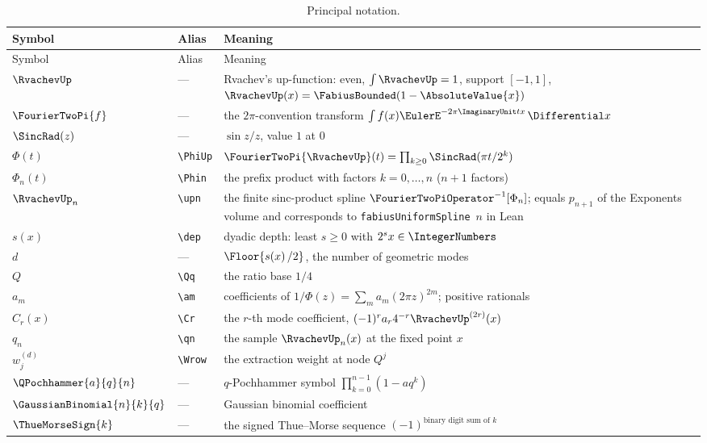 \documentclass[11pt,oneside]{article}
\theoremstyle{plain}
\theoremstyle{definition}
\theoremstyle{remark}
\newcommand{\upn}[1]{\RvachevUp_{#1}}
\newcommand{\Phin}[1]{\Phi_{#1}}                            %
\newcommand{\PhiUp}{\Phi}                                   %
\newcommand{\dep}[1]{s\!\left(#1\right)}                    %
\newcommand{\Qq}{Q}                                         %
\newcommand{\am}[1]{a_{#1}}                                 %
\newcommand{\Cr}[2]{C_{#1}\!\left(#2\right)}                %
\newcommand{\qn}[1]{q_{#1}}                                 %
\newcommand{\Wrow}[2]{w^{(#1)}_{#2}}                        %
\begin{document}
\begin{longtable}{@{}l l p{}@{}}
\caption{Principal notation.}\label{due:tab:notation}\\
\toprule
Symbol & Alias & Meaning\\
\midrule
\endfirsthead
\toprule
Symbol & Alias & Meaning\\
\midrule
\endhead
\(\RvachevUp\) & --- & Rvachev's up-function: even, \(\int\RvachevUp=1\),
  support \([-1,1]\), \(\RvachevUp(x)=\FabiusBounded(1-\AbsoluteValue{x})\)\\
\(\FourierTwoPi{f}\) & --- & the \(2\pi\)-convention transform
  \(\int f(x)\EulerE^{-2\pi\ImaginaryUnit tx}\,\Differential x\)\\
\(\SincRad(z)\) & --- & \(\sin z/z\), value \(1\) at \(0\)\\
\(\PhiUp(t)\) & \verb|\PhiUp| & \(\FourierTwoPi{\RvachevUp}(t)
  =\prod_{k\ge0}\SincRad(\pi t/2^{k})\)\\
\(\Phin{n}(t)\) & \verb|\Phin| & the prefix product with factors
  \(k=0,\ldots,n\) (\(n+1\) factors)\\
\(\upn{n}\) & \verb|\upn| & the finite sinc-product spline
  \(\FourierTwoPiOperator^{-1}[\Phin{n}]\); equals \(p_{n+1}\) of the
  Exponents volume and corresponds to \texttt{fabiusUniformSpline}~\(n\)
  in Lean\\
\(\dep{x}\) & \verb|\dep| & dyadic depth: least \(s\ge0\) with
  \(2^{s}x\in\IntegerNumbers\)\\
\(d\) & --- & \(\Floor{\dep{x}/2}\), the number of geometric modes\\
\(\Qq\) & \verb|\Qq| & the ratio base \(1/4\)\\
\(\am{m}\) & \verb|\am| & coefficients of \(1/\PhiUp(z)=\sum_{m}\am{m}(2\pi
  z)^{2m}\); positive rationals\\
\(\Cr{r}{x}\) & \verb|\Cr| & the \(r\)-th mode coefficient,
  \((-1)^{r}\am{r}4^{-r}\RvachevUp^{(2r)}(x)\)\\
\(\qn{n}\) & \verb|\qn| & the sample \(\upn{n}(x)\) at the fixed point \(x\)\\
\(\Wrow{d}{j}\) & \verb|\Wrow| & the extraction weight at node \(\Qq^{j}\)\\
\(\QPochhammer{a}{q}{n}\) & --- & \(q\)-Pochhammer symbol
  \(\prod_{k=0}^{n-1}(1-aq^{k})\)\\
\(\GaussianBinomial{n}{k}{q}\) & --- & Gaussian binomial coefficient\\
\(\ThueMorseSign{k}\) & --- & the signed Thue--Morse sequence
  \((-1)^{\text{binary digit sum of }k}\)\\

\end{longtable}
\end{document}
